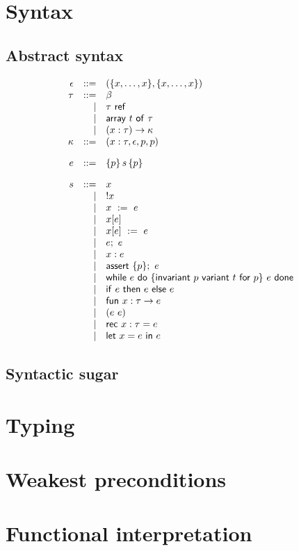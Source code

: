 
\section{Syntax}

\subsection{Abstract syntax}

\begin{displaymath}
  \begin{array}{rrl}
    \epsilon
      & ::= & (\{x,\ldots,x\}, \{x,\ldots,x\}) \\
    \tau
      & ::= & \beta \\
      &   | & \tref{\tau} \\
      &   | & \tarray{t}{\tau} \\
      &   | & (x:\tau)\rightarrow\kappa \\
    \kappa
      & ::= & (x:\tau, \epsilon, p, p) \\[1em]

    e
      & ::= & \prepost{p}{s}{p} \\[1em]
    s
      & ::= & x \\
      &   | & \access{x} \\
      &   | & \assign{x}{e} \\
      &   | & \taccess{x}{e} \\ %
      &   | & \tassign{x}{e}{e} \\ %
      &   | & \seq{e}{e} \\
      &   | & \plabel{x}{e} \\
      &   | & \assert{p}{e} \\
      &   | & \while{e}{p}{t}{p}{e} \\
      &   | & \ite{e}{e}{e} \\
      &   | & \fun{x}{\tau}{e} \\
      &   | & \app{e}{e} \\
      &   | & \rec{x}{\tau}{e} \\
      &   | & \letin{x}{e}{e}
  \end{array}
\end{displaymath}

\subsection{Syntactic sugar}

\section{Typing}

\section{Weakest preconditions}

\section{Functional interpretation}

